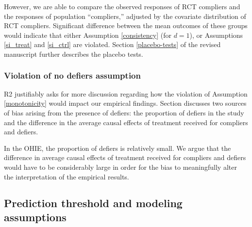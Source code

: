 \documentclass[hidelinks,12pt,letterpaper]{article}
\begin{document}
However, we are able to compare the observed responses of RCT compliers and the responses of population ``compliers,'' adjusted by the covariate distribution of RCT compliers. Significant difference between the mean outcomes of these groups would indicate that either Assumption \ref{consistency} (for $d=1$), or Assumptions \ref{si_treat} and \ref{si_ctrl} are violated. Section \ref{placebo-tests} of the revised manuscript further describes the placebo tests. 

\subsubsection{Violation of no defiers assumption}


R2 justifiably asks for more discussion regarding how the violation of Assumption \ref{monotonicity} would impact our empirical findings. Section \label{sens-defiers} discusses two sources of bias arising from the presence of defiers: the proportion of defiers in the study and the difference in the average causal effects of treatment received for compliers and defiers. 

In the OHIE, the proportion of defiers is relatively small. We argue that the difference in average causal effects of treatment received for compliers and defiers would have to be considerably large in order for the bias to meaningfully alter the interpretation of the empirical results. 

\subsection{Prediction threshold and modeling assumptions}\label{prediction-threshold}

\end{document}

